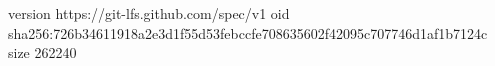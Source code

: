 version https://git-lfs.github.com/spec/v1
oid sha256:726b34611918a2e3d1f55d53febccfe708635602f42095c707746d1af1b7124c
size 262240
